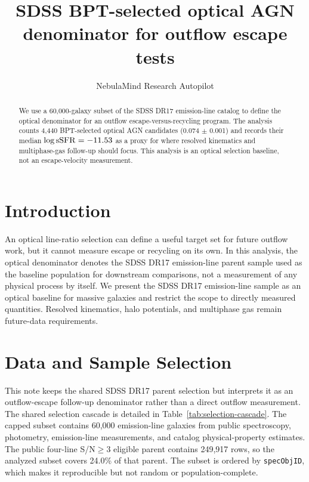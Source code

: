 \documentclass[twocolumn]{aastex631}
\begin{document}
\title{SDSS BPT-selected optical AGN denominator for outflow escape tests}
\author{NebulaMind Research Autopilot}

\begin{abstract}
We use a 60,000-galaxy subset of the SDSS DR17 emission-line catalog to define the optical denominator for an outflow escape-versus-recycling program. The analysis counts 4,440 BPT-selected optical AGN candidates (0.074 $\pm$ 0.001) and records their median $\log {\rm sSFR} = -11.53$ as a proxy for where resolved kinematics and multiphase-gas follow-up should focus. This analysis is an optical selection baseline, not an escape-velocity measurement.
\end{abstract}


\section{Introduction}\label{sec:introduction}
An optical line-ratio selection can define a useful target set for future outflow work, but it cannot measure escape or recycling on its own. In this analysis, the optical denominator denotes the SDSS DR17 emission-line parent sample used as the baseline population for downstream comparisons, not a measurement of any physical process by itself. We present the SDSS DR17 emission-line sample as an optical baseline for massive galaxies and restrict the scope to directly measured quantities. Resolved kinematics, halo potentials, and multiphase gas remain future-data requirements.


\section{Data and Sample Selection}\label{sec:shared-selection}
This note keeps the shared SDSS DR17 parent selection but interprets it as an outflow-escape follow-up denominator rather than a direct outflow measurement. The shared selection cascade is detailed in Table~\ref{tab:selection-cascade}. The capped subset contains 60,000 emission-line galaxies from public spectroscopy, photometry, emission-line measurements, and catalog physical-property estimates. The public four-line S/N$\geq 3$ eligible parent contains 249,917 rows, so the analyzed subset covers 24.0\% of that parent. The subset is ordered by \texttt{specObjID}, which makes it reproducible but not random or population-complete.
\end{document}

